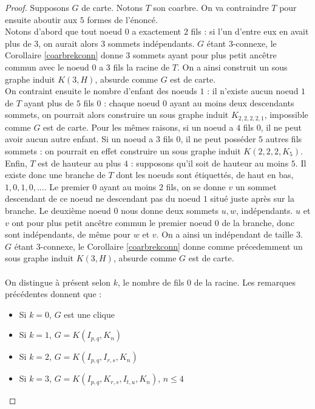 \documentclass{scrartcl}
\begin{document}
\begin{flushleft}
\begin{proof}
    Supposons $G$ de carte. Notons $T$ son coarbre. On va contraindre $T$ pour ensuite aboutir aux $5$ formes de l'énoncé.\\
    Notons d'abord que tout noeud $0$ a exactement $2$ fils : si l'un d'entre eux en avait
    plus de $3$, on aurait alors $3$ sommets indépendants. $G$ étant $3$-connexe, le Corollaire \ref{coarbrekconn} donne $3$ sommets
    ayant pour plus petit ancêtre commun avec le noeud $0$ a $3$ fils la racine de $T$. On a ainsi construit un sous graphe induit
    $K(3, H)$, absurde comme $G$ est de carte.\\
    On contraint ensuite le nombre d'enfant des noeuds $1$ : il n'existe aucun noeud $1$ de $T$ ayant plus de $5$ fils $0$ :
    chaque noeud $0$ ayant au moins deux descendants sommets, on pourrait alors construire un sous graphe induit $K_{2,2,2,2,1}$,
    impossible comme $G$ est de carte. Pour les mêmes raisons, si un noeud a $4$ fils $0$, il ne peut avoir aucun autre enfant.
    Si un noeud a $3$ fils $0$, il ne peut posséder $5$ autres fils sommets : on pourrait en effet construire un sous graphe induit
    $K(2,2,2,K_5)$.\\
    Enfin, $T$ est de hauteur au plus $4$ : supposons qu'il soit de hauteur au moins $5$. Il existe donc une branche de $T$ dont les noeuds
    sont étiquettés, de haut en bas, $1, 0, 1, 0, ...$. Le premier $0$ ayant au moins $2$ fils, on se donne $v$ un sommet descendant de ce
    noeud ne descendant pas du noeud $1$ situé juste après sur la branche. Le deuxième noeud $0$ nous donne deux sommets $u, w$, indépendants.
    $u$ et $v$ ont pour plus petit ancêtre commun le premier noeud $0$ de la branche, donc sont indépendants, de même pour $w$ et $v$. On a
    ainsi un indépendant de taille $3$. $G$ étant $3$-connexe, le Corollaire \ref{coarbrekconn} donne comme précedemment un sous
    graphe induit $K(3, H)$, absurde comme $G$ est de carte.
    \\~\\
    On distingue à présent selon $k$, le nombre de fils $0$ de la racine. Les remarques précédentes donnent que :
    \begin{itemize}
        \item Si $k = 0$, $G$ est une clique
        \item Si $k = 1$, $G = K(I_{p,q}, K_n)$
        \item Si $k = 2$, $G = K(I_{p,q}, I_{r,s}, K_n)$
        \item Si $k = 3$, $G = K(I_{p,q}, K_{r,s}, I_{t,u}, K_n)$, $n \leq 4$

\end{itemize}
\end{proof}
\end{flushleft}
\end{document}
